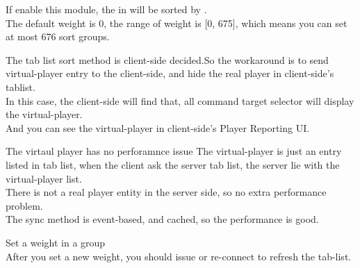 
If enable this module, the  in  will be sorted by .
\\
The default weight is 0, the range of weight is [0, 675], which means you can set at most 676 sort groups.

The tab list sort method is client-side decided.So the workaround is to send virtual-player entry to the client-side, and hide the real player in client-side's tablist.
\\
In this case, the client-side will find that, all command target selector will display the virtual-player.
\\
And you can see the virtual-player in client-side's Player Reporting UI.

\begin{note}{The virtaul player has no perforamnce issue}
    The virtual-player is just an entry listed in tab list, when the client ask the server tab list, the server lie with the virtual-player list.
    \\
    There is not a real player entity in the server side, so no extra performance problem.
    \\
    The sync method is event-based, and cached, so the performance is good.
\end{note}

\begin{example}{Set a weight in a group}
    \\
    After you set a new weight, you should issue  or re-connect to refresh the tab-list.
\end{example}



